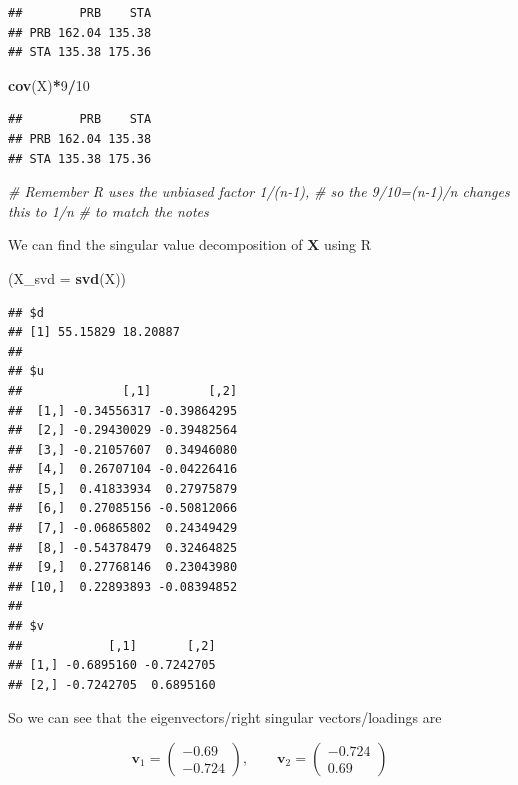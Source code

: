 \documentclass[]{book}
\newenvironment{Shaded}{\begin{snugshade}}{\end{snugshade}}
\newcommand{\CommentTok}[1]{\textcolor[rgb]{0.56,0.35,0.01}{\textit{#1}}}
\newcommand{\DataTypeTok}[1]{\textcolor[rgb]{0.13,0.29,0.53}{#1}}
\newcommand{\DecValTok}[1]{\textcolor[rgb]{0.00,0.00,0.81}{#1}}
\newcommand{\KeywordTok}[1]{\textcolor[rgb]{0.13,0.29,0.53}{\textbf{#1}}}
\newcommand{\NormalTok}[1]{#1}
\newcommand{\OperatorTok}[1]{\textcolor[rgb]{0.81,0.36,0.00}{\textbf{#1}}}
\theoremstyle{definition}
\theoremstyle{definition}
\theoremstyle{definition}
\theoremstyle{remark}
\begin{document}
\begin{verbatim}
##        PRB    STA
## PRB 162.04 135.38
## STA 135.38 175.36
\end{verbatim}

\begin{Shaded}
\begin{Highlighting}[]
\KeywordTok{cov}\NormalTok{(X)}\OperatorTok{*}\DecValTok{9}\OperatorTok{/}\DecValTok{10} 
\end{Highlighting}
\end{Shaded}

\begin{verbatim}
##        PRB    STA
## PRB 162.04 135.38
## STA 135.38 175.36
\end{verbatim}

\begin{Shaded}
\begin{Highlighting}[]
\CommentTok{# Remember R uses the unbiased factor 1/(n-1), }
\CommentTok{# so the 9/10=(n-1)/n changes this to 1/n }
\CommentTok{# to match the notes}
\end{Highlighting}
\end{Shaded}

We can find the singular value decomposition of \(\mathbf X\) using R

\begin{Shaded}
\begin{Highlighting}[]
\NormalTok{(}\DataTypeTok{X_svd =} \KeywordTok{svd}\NormalTok{(X))}
\end{Highlighting}
\end{Shaded}

\begin{verbatim}
## $d
## [1] 55.15829 18.20887
## 
## $u
##              [,1]        [,2]
##  [1,] -0.34556317 -0.39864295
##  [2,] -0.29430029 -0.39482564
##  [3,] -0.21057607  0.34946080
##  [4,]  0.26707104 -0.04226416
##  [5,]  0.41833934  0.27975879
##  [6,]  0.27085156 -0.50812066
##  [7,] -0.06865802  0.24349429
##  [8,] -0.54378479  0.32464825
##  [9,]  0.27768146  0.23043980
## [10,]  0.22893893 -0.08394852
## 
## $v
##            [,1]       [,2]
## [1,] -0.6895160 -0.7242705
## [2,] -0.7242705  0.6895160
\end{verbatim}

So we can see that the eigenvectors/right singular vectors/loadings are

\[\mathbf v_1=\begin{pmatrix} -0.69 \\ -0.724 \end{pmatrix},\qquad \mathbf v_2=\begin{pmatrix} -0.724 \\ 0.69 \end{pmatrix}\]
\end{document}
